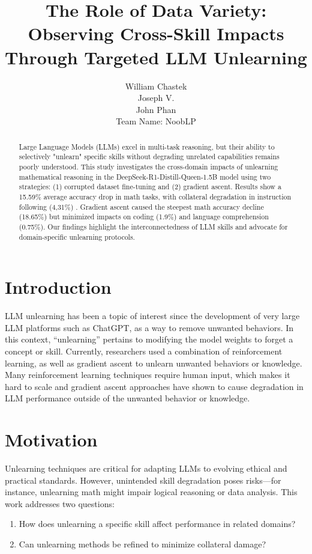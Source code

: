 \documentclass[10.5pt]{article}
\title{The Role of Data Variety: Observing Cross-Skill Impacts Through Targeted LLM Unlearning}
\author{William Chastek \\ Joseph V. \\ John Phan \\
Team Name: NoobLP}
\begin{document}
\maketitle

\begin{abstract}
Large Language Models (LLMs) excel in multi-task reasoning, but their ability to selectively "unlearn" specific skills without degrading unrelated capabilities remains poorly understood. This study investigates the cross-domain impacts of unlearning mathematical reasoning in the DeepSeek-R1-Distill-Queen-1.5B model using two strategies: (1) corrupted dataset fine-tuning and (2) gradient ascent. Results show a 15.59\% average accuracy drop in math tasks, with collateral degradation in instruction following (4,31\%) . Gradient ascent caused the steepest math accuracy decline (18.65\%) but minimized impacts on coding (1.9\%) and language comprehension (0.75\%). Our findings highlight the interconnectedness of LLM skills and advocate for domain-specific unlearning protocols.
\end{abstract}

\section{Introduction}
LLM unlearning has been a topic of interest since the development of very large LLM platforms such as ChatGPT, as a way to remove unwanted behaviors. In this context, “unlearning” pertains to modifying the model weights to forget a concept or skill. Currently, researchers used a combination of reinforcement learning\cite{mu2024rule}, as well as gradient ascent\cite{neel2020descenttodeletegradientbasedmethodsmachine} to unlearn unwanted behaviors or knowledge. Many reinforcement learning techniques require human input, which makes it hard to scale and gradient ascent approaches have shown to cause degradation in LLM performance outside of the unwanted behavior or knowledge. 

\section{Motivation}
Unlearning techniques are critical for adapting LLMs to evolving ethical and practical standards. However, unintended skill degradation poses risks—for instance, unlearning math might impair logical reasoning or data analysis. This work addresses two questions:
\begin{enumerate}
    \item How does unlearning a specific skill affect performance in related domains?
    \item Can unlearning methods be refined to minimize collateral damage?
\end{enumerate}
\end{document}
